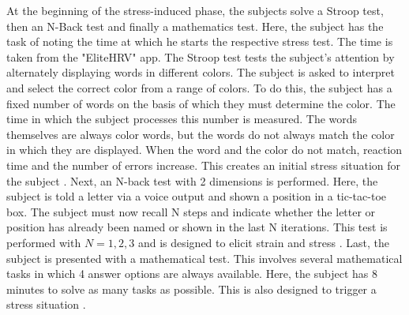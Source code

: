 At the beginning of the stress-induced phase, the subjects solve a Stroop test, then an N-Back test and finally a mathematics test. 
Here, the subject has the task of noting the time at which he starts the respective stress test.
The time is taken from the "EliteHRV" app.
The Stroop test tests the subject's attention by alternately displaying words in different colors. 
The subject is asked to interpret and select the correct color from a range of colors.
To do this, the subject has a fixed number of words on the basis of which they must determine the color. 
The time in which the subject processes this number is measured.
The words themselves are always color words, but the words do not always match the color in which they are displayed.
When the word and the color do not match, reaction time and the number of errors increase. 
This creates an initial stress situation for the subject \cite{StroopCompetitionSocialEvaluative}. 
Next, an N-back test with 2 dimensions is performed. 
Here, the subject is told a letter via a voice output and shown a position in a tic-tac-toe box. 
The subject must now recall N steps and indicate whether the letter or position has already been named or shown in the last N iterations. 
This test is performed with $N={1,2,3}$ and is designed to elicit strain and stress \cite{liangEffectAcuteStress2023}.
Last, the subject is presented with a mathematical test. 
This involves several mathematical tasks in which 4 answer options are always available.
Here, the subject has 8 minutes to solve as many tasks as possible. 
This is also designed to trigger a stress situation \cite{caviolaStressTimePressure2017}.

